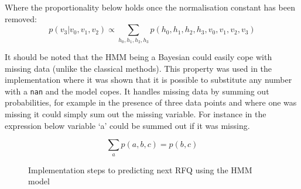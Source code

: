 Where the proportionality below holds once the normalisation constant has been removed:
\begin{equation}
    p(v_3|v_0,v_1,v_2) \propto \sum_{h_0,h_1,h_2,h_3} p (h_0,h_1,h_2,h_3,v_0,v_1,v_2,v_3)
\end{equation}

It should be noted that the HMM being a Bayesian could easily cope with missing data (unlike the classical methods). This property was used in the implementation where it was shown that it is possible to substitute any number with a \texttt{nan} and the model copes. It handles missing data by summing out probabilities, for example in the presence of three data points and where one was missing it could simply sum out the missing variable. For instance in the expression below variable `a' could be summed out if it was missing.

\begin{equation}
    \sum_{a} p (a,b,c) = p (b,c)
\end{equation}

\begin{figure}[!ht]\centering
    \caption{Implementation steps to predicting next RFQ using the HMM model}\label{Ch4Fig:predict_hmm}
\end{figure}

